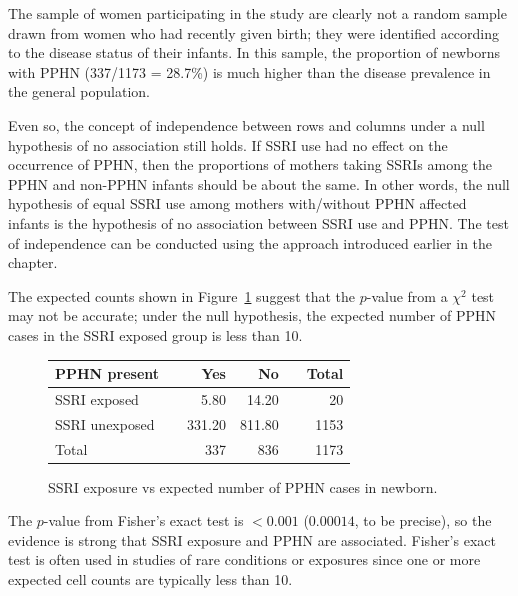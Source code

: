 The sample of women participating in the study are clearly not a random sample drawn from women who had recently given birth; they were identified according to the disease status of their infants.  In this sample, the proportion of newborns with PPHN (337/1173 = 28.7\%) is much higher than the disease prevalence in the general population.  

Even so, the concept of independence between rows and columns under a null hypothesis of no association still holds. If SSRI use had no effect on the occurrence of PPHN, then the proportions of mothers taking SSRIs among the PPHN and non-PPHN infants should be about the same. In other words, the null hypothesis of equal SSRI use among mothers with/without PPHN affected infants is the hypothesis of no association between SSRI use and PPHN. The test of independence can be conducted using the approach introduced earlier in the chapter.

The expected counts shown in Figure~\ref{ssriPPHNExpected} suggest that the $p$-value from a $\chi^2$ test may not be accurate; under the null hypothesis, the expected number of PPHN cases in the SSRI exposed group is less than 10.

 \begin{figure}[h]
	\centering
	\begin{tabular}{ll rrr r}
		\hline
		PPHN present  & \hspace{2mm} & Yes & No & \hspace{2mm} & Total \\
		\hline
		SSRI exposed &	& 5.80 & 14.20 &  & 20  \\
		SSRI unexposed & & 331.20 & 811.80 &  & 1153  \\
        Total & & 337 & 836 & & 1173 \\
		\hline
	\end{tabular}
    \caption{SSRI exposure vs expected number of PPHN cases in newborn.}
    \label{ssriPPHNExpected}
\end{figure}	

The $p$-value from Fisher's exact test is $< 0.001$ ($0.00014$, to be precise), so the evidence is strong that SSRI exposure and PPHN are associated. Fisher's exact test is often used in studies of rare conditions or exposures since one or more expected cell counts are typically less than 10.



\textD{\newpage}


